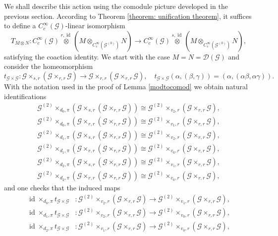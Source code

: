 \documentclass{amsart}
\newcommand{\G}{\mathcal{G}}
\newcommand{\DG}{\mathcal{D}(\mathcal{G})}
\newcommand{\ccinfty}{C_c^\infty}
\DeclareMathOperator{\id}{id}
\begin{document}
We shall describe this action using the comodule picture developed in the previous section. According to Theorem \ref{theorem: unification theorem}, 
it suffices to define a $ \ccinfty(\G) $-linear isomorphism 
$$ 
T_{M\otimes N}: \ccinfty(\G) \stackrel{r,\id}{\otimes}(M\otimes_{\ccinfty(\G^{(0)})} N) \rightarrow \ccinfty(\G)\stackrel{s,\id}{\otimes}(M\otimes_{\ccinfty(\G^{(0)})} N),
$$
satisfying the coaction identity.
We start with the case $ M = N = \DG $ and consider the homeomorphism 
$$
t_{\G \times \G}: \G \stackrel{}{\times_{s,r}}(\G\stackrel{}{\times_{r,r}} \G) \rightarrow \G \stackrel{}{\times_{r,r}}(\G \stackrel{}{\times_{r,r}} \G), 
\quad t_{\G \times \G}(\alpha,(\beta,\gamma)) = (\alpha,(\alpha\beta, \alpha\gamma)). 
$$
With the notation used in the proof of Lemma \ref{modtocomod} we obtain natural identifications 
\begin{align*} 
\G^{(2)} \times_{d_0, \pi}(\G \stackrel{}{\times_{s,r}}(\G \stackrel{}{\times_{r,r}} \G)) \cong \G^{(2)} \stackrel{}{\times_{v_2,r}}(\G\stackrel{}{\times_{r,r}} \G), \\
\G^{(2)} \times_{d_0, \pi}(\G \stackrel{}{\times_{r,r}}(\G\stackrel{}{\times_{r,r}} \G)) \cong \G^{(2)} \stackrel{}{\times_{v_1,r}}(\G\stackrel{}{\times_{r,r}} \G), \\ 
\G^{(2)} \times_{d_1, \pi}(\G \stackrel{}{\times_{s,r}}(\G \stackrel{}{\times_{r,r}} \G)) \cong \G^{(2)} \stackrel{}{\times_{v_2,r}}(\G\stackrel{}{\times_{r,r}} \G), \\
\G^{(2)} \times_{d_1, \pi}(\G \stackrel{}{\times_{r,r}}(\G\stackrel{}{\times_{r,r}} \G)) \cong \G^{(2)} \stackrel{}{\times_{v_0,r}}(\G\stackrel{}{\times_{r,r}} \G), \\
\G^{(2)} \times_{d_2, \pi}(\G \stackrel{}{\times_{s,r}}(\G \stackrel{}{\times_{r,r}} \G)) \cong \G^{(2)} \stackrel{}{\times_{v_1,r}}(\G\stackrel{}{\times_{r,r}} \G), \\
\G^{(2)} \times_{d_2, \pi}(\G \stackrel{}{\times_{r,r}}(\G\stackrel{}{\times_{r,r}} \G)) \cong \G^{(2)} \stackrel{}{\times_{v_0,r}}(\G\stackrel{}{\times_{r,r}} \G), 
\end{align*} 
and one checks that the induced maps 
\begin{align*}
\id \times_{d_0,\pi} t_{\G \times \G}&:\G^{(2)} \stackrel{}{\times_{v_2,r}}(\G\stackrel{}{\times_{r,r}} \G)\rightarrow \G^{(2)} \stackrel{}{\times_{v_1,r}}(\G\stackrel{}{\times_{r,r}} \G),\\
\id \times_{d_1,\pi} t_{\G \times \G}&:\G^{(2)} \stackrel{}{\times_{v_2,r}}(\G\stackrel{}{\times_{r,r}} \G) \rightarrow \G^{(2)} \stackrel{}{\times_{v_0,r}}(\G\stackrel{}{\times_{r,r}} \G),\\
\id \times_{d_2,\pi} t_{\G \times \G}&:\G^{(2)} \stackrel{}{\times_{v_1,r}}(\G\stackrel{}{\times_{r,r}} \G) \rightarrow \G^{(2)} \stackrel{}{\times_{v_0,r}}(\G\stackrel{}{\times_{r,r}} \G), 
\end{align*}
\end{document}
